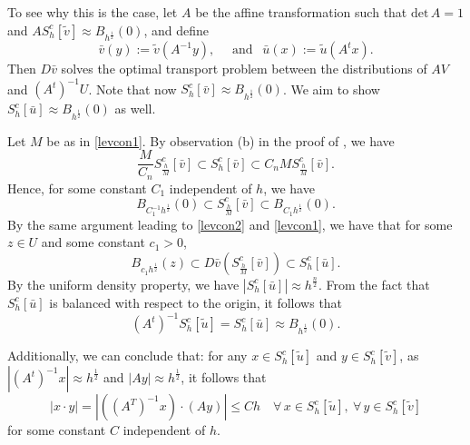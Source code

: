 \documentclass[11pt]{amsart}
\theoremstyle{plain}
\renewcommand{\det}{\mbox{det}}
\newcommand{\0}{\textbf{0}}
\numberwithin{equation}{section}
\numberwithin{equation}{section}
\numberwithin{figure}{section}
\begin{document}
\begin{enumerate}
To see why this is the case, let \( A \) be the affine transformation such that \( \det\, A = 1 \) and \( AS^c_h[\tilde{v}] \approx B_{h^{\frac{1}{2}}}(0) \), and define
	\[ \bar{v}(y) := \tilde{v}(A^{-1}y),\quad\text{ and }\ \ \bar{u}(x) := \tilde{u}(A^t x). \] 
Then \( D\bar{v} \) solves the optimal transport problem between the distributions of \( AV \) and \( (A^t)^{-1}U \).
Note that now \( S^c_h[\bar{v}] \approx B_{h^{\frac{1}{2}}}(0) \). We aim to show \( S^c_h[\bar{u}] \approx B_{h^{\frac{1}{2}}}(0) \) as well.

Let \( M \) be as in \eqref{levcon1}. By observation (b) in the proof of \cite[Lemma 4.1]{C96}, we have  
\[
\frac{M}{C_n}S_{\frac{h}{M}}^c[\bar v] \subset S_h^c[\bar v] \subset C_nMS_{\frac{h}{M}}^c[\bar v].
\]
Hence, for some constant \( C_1 \) independent of \( h \), we have
\[
B_{C_1^{-1}h^{\frac{1}{2}}}(0) \subset S_{\frac{h}{M}}^c[\bar v] \subset B_{C_1h^{\frac{1}{2}}}(0).
\]
By the same argument leading to \eqref{levcon2} and \eqref{levcon1}, we have that for some \( z \in U \) and some constant \( c_1 > 0 \),
\[
B_{c_1h^{\frac{1}{2}}}(z) \subset D\bar v\left(S_{\frac{h}{M}}^c[\bar v] \right) \subset S^c_h[\bar u].
\]
By the uniform density property, we have \( |S^c_h[\bar u]| \approx h^{\frac{n}{2}} \).
From the fact that \( S^c_h[\bar u] \) is balanced with respect to the origin, it follows that
\[
(A^t)^{-1}S^c_h[\tilde{u}] = S^c_h[\bar u] \approx B_{h^{\frac{1}{2}}}(0).
\]


Additionally, we can conclude that: for any \( x \in S^c_h[\tilde{u}] \) and \( y \in S^c_h[\tilde{v}] \), as \( |(A^t)^{-1} x| \approx h^{\frac{1}{2}} \) and \( |A y| \approx h^{\frac{1}{2}} \), it follows that 
\begin{equation}\label{dualex1}
|x \cdot y|=|((A^T)^{-1} x)\cdot (A y)| \leq Ch \quad \forall\, x \in S^c_h[\tilde{u}],\ \forall\, y \in S^c_h[\tilde{v}]
\end{equation}
for some constant \( C \) independent of \( h \).     
    

\end{enumerate}
\end{document}
